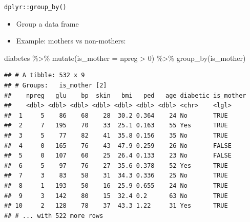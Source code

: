 \documentclass[
  ignorenonframetext,
]{beamer}
\newenvironment{Shaded}{\begin{snugshade}}{\end{snugshade}}
\newcommand{\AttributeTok}[1]{\textcolor[rgb]{0.77,0.63,0.00}{#1}}
\newcommand{\DecValTok}[1]{\textcolor[rgb]{0.00,0.00,0.81}{#1}}
\newcommand{\FunctionTok}[1]{\textcolor[rgb]{0.00,0.00,0.00}{#1}}
\newcommand{\NormalTok}[1]{#1}
\newcommand{\SpecialCharTok}[1]{\textcolor[rgb]{0.00,0.00,0.00}{#1}}
\providecommand{\tightlist}{%
  \setlength{\itemsep}{0pt}\setlength{\parskip}{0pt}}
\begin{document}
\begin{frame}[fragile]{\texttt{dplyr::group\_by()}}
\protect\hypertarget{dplyrgroup_by}{}
\begin{itemize}
\tightlist
\item
  Group a data frame
\item
  Example: mothers vs non-mothers:
\end{itemize}

\begin{Shaded}
\begin{Highlighting}[]
\NormalTok{diabetes }\SpecialCharTok{\%\textgreater{}\%} 
  \FunctionTok{mutate}\NormalTok{(}\AttributeTok{is\_mother =}\NormalTok{ npreg }\SpecialCharTok{\textgreater{}} \DecValTok{0}\NormalTok{) }\SpecialCharTok{\%\textgreater{}\%} 
  \FunctionTok{group\_by}\NormalTok{(is\_mother)}
\end{Highlighting}
\end{Shaded}

\begin{verbatim}
## # A tibble: 532 x 9
## # Groups:   is_mother [2]
##    npreg   glu    bp  skin   bmi   ped   age diabetic is_mother
##    <dbl> <dbl> <dbl> <dbl> <dbl> <dbl> <dbl> <chr>    <lgl>    
##  1     5    86    68    28  30.2 0.364    24 No       TRUE     
##  2     7   195    70    33  25.1 0.163    55 Yes      TRUE     
##  3     5    77    82    41  35.8 0.156    35 No       TRUE     
##  4     0   165    76    43  47.9 0.259    26 No       FALSE    
##  5     0   107    60    25  26.4 0.133    23 No       FALSE    
##  6     5    97    76    27  35.6 0.378    52 Yes      TRUE     
##  7     3    83    58    31  34.3 0.336    25 No       TRUE     
##  8     1   193    50    16  25.9 0.655    24 No       TRUE     
##  9     3   142    80    15  32.4 0.2      63 No       TRUE     
## 10     2   128    78    37  43.3 1.22     31 Yes      TRUE     
## # ... with 522 more rows
\end{verbatim}
\end{frame}
\end{document}
